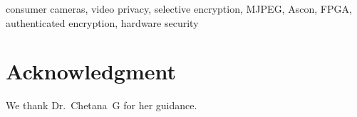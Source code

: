 \documentclass[journal]{IEEEtran}
\theoremstyle{definition}\newtheorem{definition}{Definition}
\begin{document}
\begin{IEEEkeywords}
consumer cameras, video privacy, selective encryption, MJPEG, Ascon, FPGA, authenticated encryption, hardware security
\end{IEEEkeywords}









\section*{Acknowledgment}
We thank Dr.~Chetana~G for her guidance. 



\end{document}
